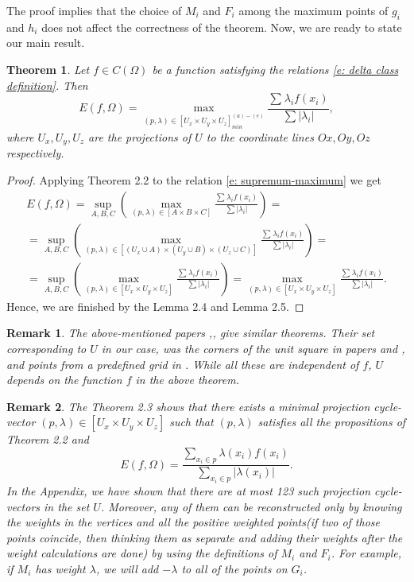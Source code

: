 \documentclass[12p]{article}
\numberwithin{equation}{section}
\newtheorem{theorem}{Theorem}[section]
\newtheorem{remark}{Remark}[section]
\begin{document}
The proof implies that the choice of \(M_i\) and \(F_i\) among the maximum points of \(g_i\) and \(h_i\) does not affect the correctness of the theorem. Now, we are ready to state our main result.
\begin{theorem}
    Let \(f \in C(\Omega)\) be a function satisfying the relations \eqref{e: delta class definition}. Then
    \begin{equation}
        E(f,\Omega)=\max_{(p,\lambda) \in [U_x\times U_y \times U_z]^{(a)-(e)}_{min}}\frac{\sum_{} \lambda_if(x_i)}{\sum|\lambda_i|},
    \end{equation}
    where \(U_x, U_y, U_z\) are the projections of \(U\) to the coordinate lines \(Ox,Oy,Oz\) respectively.
\end{theorem}
\begin{proof}
Applying Theorem 2.2 to the relation \eqref{e: supremum-maximum} we get
\begin{equation}
\begin{split}\label{e: main result}
    E(f,\Omega)=\sup_{A,B,C}  \left({\max_{(p,\lambda)\in [A\times B\times C]} \frac{\sum_{}\lambda_if(x_i)}{\sum|\lambda_i|}}\right)=\\=\sup_{ A,B,C}  \left({\max_{(p,\lambda)\in [(U_x \cup A)\times (U_y \cup B) \times (U_z \cup C)]} \frac{\sum_{}\lambda_if(x_i)}{\sum|\lambda_i|}}\right)=\\
   =\sup_{A,B,C}  \left(\max_{(p,\lambda) \in [U_x\times U_y \times U_z]}\frac{\sum_{} \lambda_if(x_i)}{\sum|\lambda_i|}\right)=
   \max_{(p,\lambda) \in [U_x\times U_y \times U_z]}\frac{\sum_{} \lambda_if(x_i)}{\sum|\lambda_i|}.
\end{split}
\end{equation} 
Hence, we are finished by the Lemma 2.4 and Lemma 2.5.
\end{proof}
\begin{remark}
    The above-mentioned papers \cite{Diliberto_Straus},\cite{Flatto}, \cite{Ismailov_2021} give similar theorems. Their set corresponding to \(U\) in our case, was the corners of the unit square in papers  \cite{Diliberto_Straus} and \cite{Flatto}, and points from a predefined grid in \cite{Ismailov_2021}. While all these are independent of \(f\), \(U\) depends on the function \(f\) in the above theorem.  
\end{remark}
\begin{remark}
    The Theorem 2.3 shows that there exists a minimal projection cycle-vector \((p,\lambda) \in [U_x\times U_y \times U_z]\) such that \((p,\lambda)\) satisfies all the propositions of Theorem 2.2 and 
    \[
    E(f,\Omega)=\frac{\sum_{x_i \in p} \lambda(x_i)f(x_i)}{\sum_{x_i \in p}|\lambda(x_i)|}.
    \]
    In the Appendix, we have shown that there are at most 123 such projection cycle-vectors in the set  \(U\). Moreover, any of them can be reconstructed only by knowing the weights in the vertices and all the positive weighted points(if two of those points coincide, then thinking them as separate and adding their weights after the weight calculations are done) by using the definitions of $M_i$ and $F_i$. For example, if $M_i$ has weight $\lambda$, we will add $-\lambda$ to all of the points on $G_i$. 
\end{remark}
\end{document}
